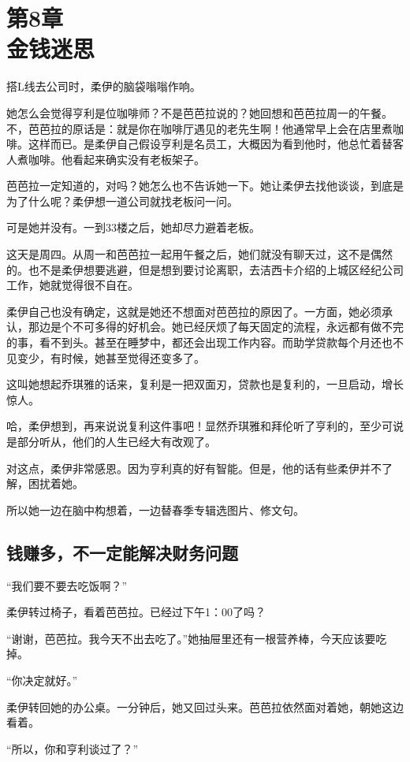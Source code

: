 \section[第8章\q 金钱迷思]{第8章\\ 金钱迷思}
\label{sec:ch8}

搭L线去公司时，柔伊的脑袋嗡嗡作响。

她怎么会觉得亨利是位咖啡师？不是芭芭拉说的？她回想和芭芭拉周一的午餐。不，芭芭拉的原话是：就是你在咖啡厅遇见的老先生啊！他通常早上会在店里煮咖啡。这样而已。是柔伊自己假设亨利是名员工，大概因为看到他时，他总忙着替客人煮咖啡。他看起来确实没有老板架子。

芭芭拉一定知道的，对吗？她怎么也不告诉她一下。她让柔伊去找他谈谈，到底是为了什么呢？柔伊想一道公司就找老板问一问。

可是她并没有。一到33楼之后，她却尽力避着老板。

这天是周四。从周一和芭芭拉一起用午餐之后，她们就没有聊天过，这不是偶然的。也不是柔伊想要逃避，但是想到要讨论离职，去洁西卡介绍的上城区经纪公司工作，她就觉得很不自在。

柔伊自己也没有确定，这就是她还不想面对芭芭拉的原因了。一方面，她必须承认，那边是个不可多得的好机会。她已经厌烦了每天固定的流程，永远都有做不完的事，看不到头。甚至在睡梦中，都还会出现工作内容。而助学贷款每个月还也不见变少，有时候，她甚至觉得还变多了。

这叫她想起乔琪雅的话来，复利是一把双面刃，贷款也是复利的，一旦启动，增长惊人。

哈，柔伊想到，再来说说复利这件事吧！显然乔琪雅和拜伦听了亨利的，至少可说是部分听从，他们的人生已经大有改观了。

对这点，柔伊非常感恩。因为亨利真的好有智能。但是，他的话有些柔伊并不了解，困扰着她。

所以她一边在脑中构想着，一边替春季专辑选图片、修文句。

\subsection{钱赚多，不一定能解决财务问题}

“我们要不要去吃饭啊？”

柔伊转过椅子，看着芭芭拉。已经过下午1：00了吗？

“谢谢，芭芭拉。我今天不出去吃了。”她抽屉里还有一根营养棒，今天应该要吃掉。

“你决定就好。”

柔伊转回她的办公桌。一分钟后，她又回过头来。芭芭拉依然面对着她，朝她这边看着。

“所以，你和亨利谈过了？”

